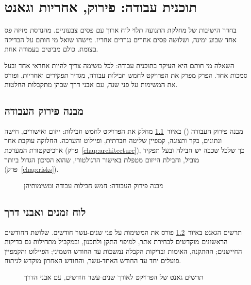 \chapter{תוכנית עבודה: פירוק, אחריות וגאנט}\label{chap:workplan}
\begin{scenebox}
בחדר הישיבות של מחלקת התנועה תלוי לוח ארוך עם פסים צבעוניים. מהנדסת מזיזה פס אחד שבוע ימינה,
ושלושה פסים אחרים נגררים אחריו. מישהו שואל מי חותם על הבדיקה בצומת. כולם מביטים בעמודה אחת.
\end{scenebox}

השאלה מי חותם היא העיקר בתוכנית עבודה: לכל משימה צריך להיות אחראי אחד ובעל סמכות אחד.
הפרק מפרק את הפרויקט לחמש חבילות עבודה, מגדיר תפקידים ואחריות, ופורס את המשימות על פני שנה, עם אבני דרך שבהן מתקבלות החלטות.

\section{מבנה פירוק העבודה}
מבנה פירוק העבודה () באיור~\ref{fig:t3} מחלק את הפרויקט לחמש חבילות: ייזום ואישורים, חישה ונתונים, בקר ותצוגה, קמפיין שליטה חברתית, ופיילוט והערכה.
החלוקה עוקבת אחר ארכיטקטורת המערכת (פרק~\ref{chap:architecture}), כך שלכל שכבה יש חבילה ובעל תפקיד מוביל, וחבילת הייזום מטפלת באישור הרגולטורי, שהוא הסיכון הגדול ביותר (פרק~\ref{chap:risks}).

\begin{figure}[ht]
  \centering
  \caption{מבנה פירוק העבודה: חמש חבילות עבודה ומשימותיהן}
  \label{fig:t3}
\end{figure}

\section{לוח זמנים ואבני דרך}
תרשים הגאנט באיור~\ref{fig:gantt} פורס את המשימות על פני שנים-עשר חודשים. שלושת החודשים הראשונים מוקדשים לבחירת אתר, למיפוי התקן ולתכנון, ובמקביל מתחילות גם בדיקות החיישנים; ההתקנה, האימות ובדיקות הקבלה נמשכות עד החודש השמיני; הפיילוט והקמפיין פועלים יחד עד החודש האחד-עשר, והחודש האחרון מוקדש לניתוח.

\begin{figure}[ht]
  \centering
  \caption{תרשים גאנט של הפרויקט לאורך שנים-עשר חודשים, עם אבני הדרך}
  \label{fig:gantt}
\end{figure}

